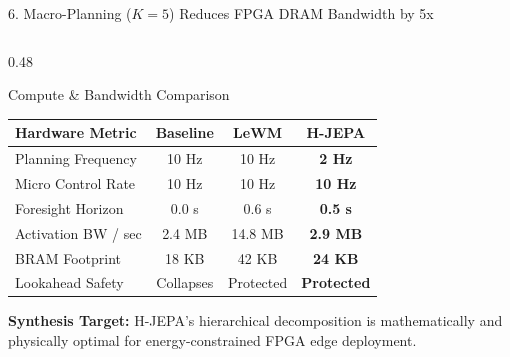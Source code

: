 \documentclass[aspectratio=169, 10pt]{beamer}
\begin{document}
\begin{frame}{6. Macro-Planning ($K=5$) Reduces FPGA DRAM Bandwidth by 5x}
\begin{columns}[T]
    \begin{column}{0.48\textwidth}
      \begin{block}{Compute \& Bandwidth Comparison}
        \scriptsize
        \centering
        \setlength{\tabcolsep}{3pt}
        \begin{tabular}{lccc}
          \toprule
          \textbf{Hardware Metric} & \textbf{Baseline} & \textbf{LeWM} & \textbf{H-JEPA} \\
          \midrule
          Planning Frequency & 10 Hz & 10 Hz & \textbf{2 Hz} \\
          Micro Control Rate & 10 Hz & 10 Hz & \textbf{10 Hz} \\
          Foresight Horizon & 0.0 s & 0.6 s & \textbf{0.5 s} \\
          Activation BW / sec & 2.4 MB & 14.8 MB & \textbf{2.9 MB} \\
          BRAM Footprint & 18 KB & 42 KB & \textbf{24 KB} \\
          Lookahead Safety & Collapses & Protected & \textbf{Protected} \\
          \bottomrule
        \end{tabular}
      \end{block}
      \vspace{0.05cm}
      \scriptsize \textbf{Synthesis Target:} H-JEPA's hierarchical decomposition is mathematically and physically optimal for energy-constrained FPGA edge deployment.
    \end{column}
  \end{columns}
\end{frame}
\end{document}
